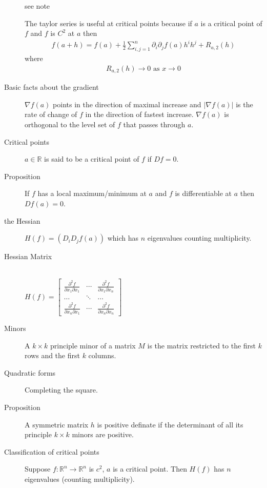 \begin{description}
\item[] see note
\item[] The taylor series is useful at critical points because if $a$ is a critical point of $f$ and $f$ is $C^2$ at $a$ then
\begin{align*}
f(a+h) = f(a) + \frac{1}{2}\sum\limits_{i, j = 1}^{n} \partial_i \partial_j f(a)h^i h^j + R_{a,2}(h)
\end{align*}
where
\begin{align*}
R_{a,2}(h) \rightarrow 0 \text{ as } x \rightarrow 0
\end{align*}
\item[Basic facts about the gradient] $\nabla f(a)$ points in the direction of maximal increase and $|\nabla f(a)|$ is the rate of change of $f$ in the direction of fastest increase. $\nabla f(a)$ is orthogonal to the level set of $f$ that passes through $a$.
\item[Critical points] $a \in \mathbb{R}$ is said to be a critical point of $f$ if $Df = 0$.
\item[Proposition] If $f$ has a local maximum/minimum at $a$ and $f$ is differentiable at $a$ then $Df(a) = 0$.
\item[the Hessian] $H(f) = (D_i D_j f(a))$ which has $n$ eigenvalues counting multiplicity.
\item[Hessian Matrix]\hfill\\
$H(f) = \begin{bmatrix}
\frac{\partial^2 f}{\partial x_1\partial x_1} & \cdots & \frac{\partial^2 f}{\partial x_1\partial x_n}\\
\ldots & \ddots & \ldots \\
\frac{\partial^2 f}{\partial x_n\partial x_1} & \cdots & \frac{\partial^2 f}{\partial x_n\partial x_n}
\end{bmatrix}$
\item[Minors] A $k \times k$ principle minor of a matrix $M$ is the matrix restricted to the first $k$ rows and the first $k$ columns.
\item[Quadratic forms] Completing the square.
\item[Proposition] A symmetric matrix $h$ is positive definate if the determinant of all its principle $k \times k$ minors are positive.
\item[Classification of critical points]
Suppose $f: \mathbb{R}^n \to \mathbb{R}^n$ is $c^2$, $a$ is a critical point. Then $H(f)$ has $n$ eigenvalues (counting multiplicity).

\end{description}
